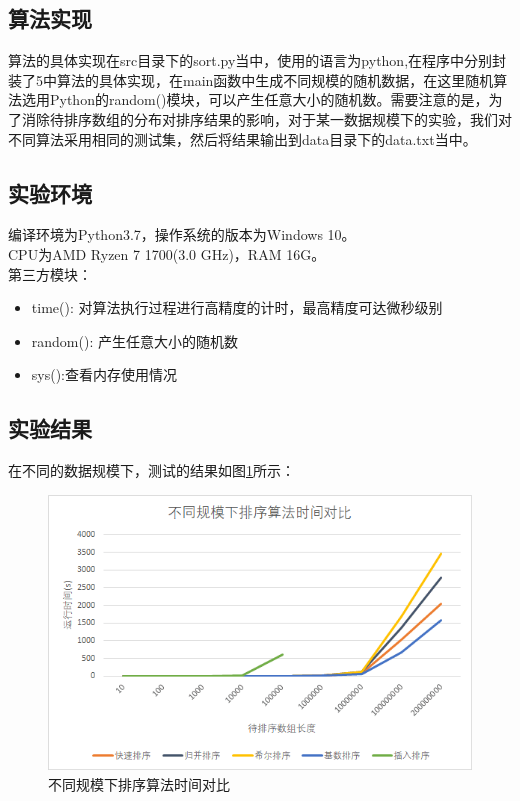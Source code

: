 \documentclass[UTF8]{ctexart}
\begin{document}
\subsection{算法实现}

算法的具体实现在src目录下的sort.py当中，使用的语言为python,在程序中分别封装了5中算法的具体实现，在main函数中生成不同规模的随机数据，在这里随机算法选用Python的random()模块，可以产生任意大小的随机数。需要注意的是，为了消除待排序数组的分布对排序结果的影响，对于某一数据规模下的实验，我们对不同算法采用相同的测试集，然后将结果输出到data目录下的data.txt当中。

\subsection{实验环境}
编译环境为Python3.7，操作系统的版本为Windows 10。\\
CPU为AMD Ryzen 7 1700(3.0 GHz)，RAM 16G。\\
第三方模块：
\begin{itemize}
\item time(): 对算法执行过程进行高精度的计时，最高精度可达微秒级别
\item random(): 产生任意大小的随机数
\item sys():查看内存使用情况
\end{itemize}

\subsection{实验结果}
在不同的数据规模下，测试的结果如图\ref{compare}所示：

\begin{figure}[H]
    \centering
    \includegraphics[width=1\textwidth]{img/compare.png}
    \caption{不同规模下排序算法时间对比}
    \label{compare}
\end{figure}
\end{document}
